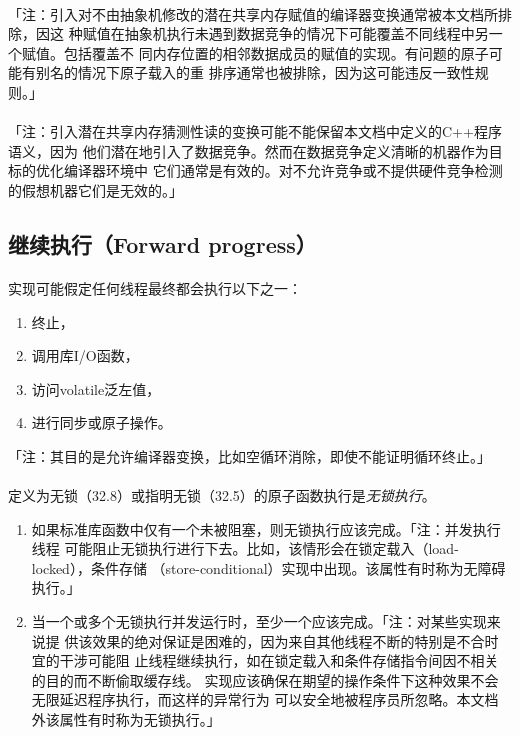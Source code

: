 \paragraph{}
「注：引入对不由抽象机修改的潜在共享内存赋值的编译器变换通常被本文档所排除，因这
种赋值在抽象机执行未遇到数据竞争的情况下可能覆盖不同线程中另一个赋值。包括覆盖不
同内存位置的相邻数据成员的赋值的实现。有问题的原子可能有别名的情况下原子载入的重
排序通常也被排除，因为这可能违反一致性规则。」

\paragraph{}
「注：引入潜在共享内存猜测性读的变换可能不能保留本文档中定义的C++程序语义，因为
他们潜在地引入了数据竞争。然而在数据竞争定义清晰的机器作为目标的优化编译器环境中
它们通常是有效的。对不允许竞争或不提供硬件竞争检测的假想机器它们是无效的。」

\subsection{继续执行（Forward progress）}
\paragraph{}
实现可能假定任何线程最终都会执行以下之一：
\begin{enumerate}
  \item{终止，}
  \item{调用库I/O函数，}
  \item{访问volatile泛左值，}
  \item{进行同步或原子操作。}
\end{enumerate}
「注：其目的是允许编译器变换，比如空循环消除，即使不能证明循环终止。」

\paragraph{}
定义为无锁（32.8）或指明无锁（32.5）的原子函数执行是\textit{无锁执行}。
\begin{enumerate}
  \item{如果标准库函数中仅有一个未被阻塞，则无锁执行应该完成。「注：并发执行线程
    可能阻止无锁执行进行下去。比如，该情形会在锁定载入（load-locked），条件存储
    （store-conditional）实现中出现。该属性有时称为无障碍执行。」}
  \item{当一个或多个无锁执行并发运行时，至少一个应该完成。「注：对某些实现来说提
    供该效果的绝对保证是困难的，因为来自其他线程不断的特别是不合时宜的干涉可能阻
    止线程继续执行，如在锁定载入和条件存储指令间因不相关的目的而不断偷取缓存线。
    实现应该确保在期望的操作条件下这种效果不会无限延迟程序执行，而这样的异常行为
    可以安全地被程序员所忽略。本文档外该属性有时称为无锁执行。」}
\end{enumerate}

